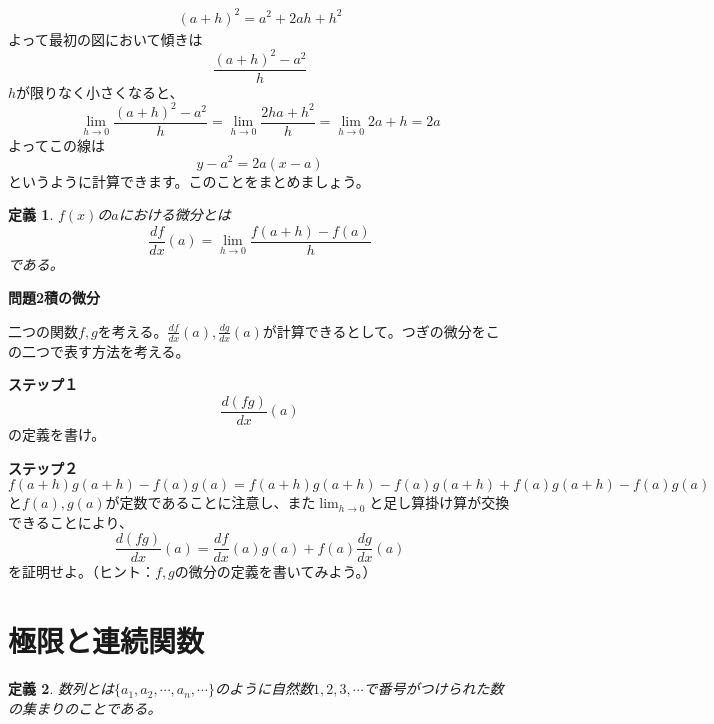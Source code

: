\documentclass{ltjsarticle}
\newtheorem{definition}{定義}[section]
\begin{document}
\begin{align*}
(a+h)^2 = a^2+2ah+h^2
\end{align*}
よって最初の図において傾きは
\begin{equation*}
{\frac {(a+h)^2-a^2} {h}} 
\end{equation*}
$h$が限りなく小さくなると、
\begin{equation*}
\lim_{h\to0} {\frac {(a+h)^2-a^2} {h}} = \lim_{h\to0}{\frac {2ha+h^2} h} = \lim_{h\to0}2a+h = 2a
\end{equation*}
よってこの線は
\begin{equation*}
y - a^2 = 2a(x-a)
\end{equation*}
というように計算できます。このことをまとめましょう。
\begin{definition}
$f(x)$の$a$における微分とは
\begin{equation*}
{\frac {df} {dx}}(a) = \lim_{h\to0}{\frac {f(a+h)-f(a)} h}
\end{equation*}
である。
\end{definition}

\par\textbf{問題2積の微分}
\par 二つの関数$f,g$を考える。${\frac {df} {dx}}(a),{\frac {dg} {dx}}(a)$が計算できるとして。つぎの微分をこの二つで表す方法を考える。
\par\textbf{ステップ１}
\begin{equation*}
{\frac {d(fg)} {dx}}(a) 
\end{equation*}
の定義を書け。
\par\textbf{ステップ２}
\begin{equation*}
f(a+h)g(a+h) -f(a)g(a) = f(a+h)g(a+h)-f(a)g(a+h)+f(a)g(a+h)-f(a)g(a)
\end{equation*}
と$f(a),g(a)$が定数であることに注意し、また$\lim_{h\to 0}$と足し算掛け算が交換できることにより、
\begin{equation*}
{\frac {d(fg)} {dx}}(a)  = {\frac {df} {dx}}(a)g(a)+f(a){\frac {dg} {dx}}(a)
\end{equation*}
を証明せよ。（ヒント：$f,g$の微分の定義を書いてみよう。）

\section{極限と連続関数}

\begin{definition}
数列とは$\{a_1,a_2,\cdots,a_n,\cdots\}$のように自然数$1,2,3,\cdots$で番号がつけられた数の集まりのことである。
\end{definition}
\end{document}
